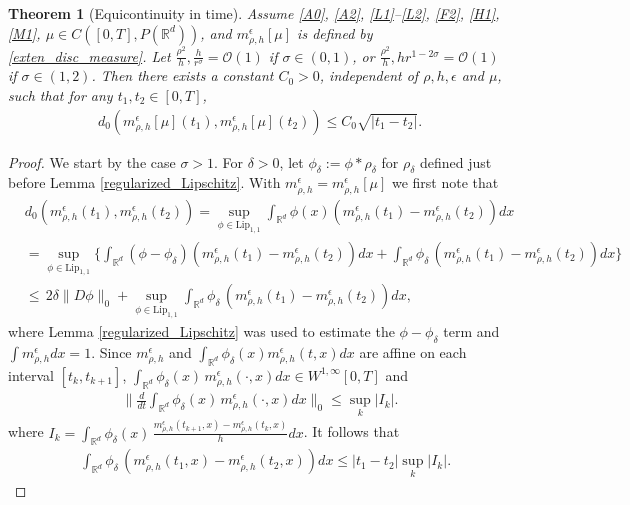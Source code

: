 \documentclass[a4paper,  twoside, 10pt, leqno]{amsart}
\newcommand{\R}{\mathbb{R}}
\newcommand{\rd}{\mathbb{R}^d}
\newcommand{\Lip}{\mbox{Lip}}
\newtheorem{thm}{Theorem}[section]
\theoremstyle{remark}
\theoremstyle{definition}
\begin{document}
\begin{thm}[Equicontinuity in time]\label{thm:time_equicont_m}
    Assume \ref{A0}, \ref{A2}, \ref{L1}--\ref{L2},  \ref{F2}, \ref{H1}, \ref{M1}, $\mu \in  C ( [0,T], P ( \rd ))$, and  $m^{\epsilon}_{\rho,h}[\mu]$ is defined by \eqref{exten_disc_measure}.  Let  $\frac{\rho^{2}}{h},\frac h{r^{\sigma}}=\mathcal{O}(1)$ if $\sigma\in (0,1)$, or  $\frac{\rho^{2}}{h},h r^{1-2\sigma}=\mathcal{O}(1)$ if $\sigma\in (1,2)$. Then there exists a constant $C_0>0$, independent of $\rho, h, \epsilon$ and $\mu$, such that for any $t_1,t_2 \in [0,T]$,
\begin{align*}
d_0 (m^\epsilon_{\rho,h}[\mu](t_1),m^\epsilon_{\rho,h}[\mu](t_2)) \leq C_0 \sqrt{|t_1-t_2|}. 
\end{align*}
\end{thm}
\begin{proof}
We start by the case $\sigma>1$. For $\delta>0$, let $\phi_{\delta}:= \phi*\rho_{\delta}$ for $\rho_{\delta}$ defined just before Lemma \ref{regularized_Lipschitz}. With $m^\epsilon_{\rho,h}=m^\epsilon_{\rho,h}[\mu]$ we first note that
\begin{align} 
  & d_0  (m^\epsilon_{\rho,h}(t_1), m^\epsilon_{\rho,h}(t_2))=  \sup_{\phi\in \Lip_{1,1}}\int_{\rd} \phi(x) (m^\epsilon_{\rho,h}(t_1)-m^\epsilon_{\rho,h}(t_2))dx \nonumber\\
 &=  \sup_{\phi\in \Lip_{1,1}}\Big\{\int_{\rd}(\phi-\phi_\delta)(m^\epsilon_{\rho,h}(t_1)-m^\epsilon_{\rho,h}(t_2))dx + \int_{\rd} \phi_\delta \,  (m^\epsilon_{\rho,h}(t_1)-m^\epsilon_{\rho,h}(t_2))dx\Big\} \nonumber\\
 & \leq \, 2 \delta \| D\phi \|_0  + \sup_{\phi\in \Lip_{1,1}}\int_{\rd} \phi_\delta \, (m^\epsilon_{\rho,h}(t_1)-m^\epsilon_{\rho,h}(t_2))dx, \label{regular_KR_dist}
\end{align}
where Lemma \ref{regularized_Lipschitz} was used to estimate the $\phi-\phi_\delta$ term and $\int m^\epsilon_{\rho,h}dx=1$. Since $m^\epsilon_{\rho,h}$ and $\int_{\R^d} \phi_{\delta}(x) m^\epsilon_{\rho,h}(t,x)dx$ are affine on each interval $[t_k,t_{k+1}]$,  $\int_{\R^d} \phi_{\delta}(x) \, m^\epsilon_{\rho,h}(\cdot,x)dx\in W^{1,\infty}[0,T]$ and 
\begin{align*}
\Big\|\frac{d}{dt} \int_{\R^d} \phi_{\delta}(x) \, m^\epsilon_{\rho,h}(\cdot,x) dx\Big\|_{0} \leq \sup_k |I_k|.
\end{align*}
where $I_k= \int_{\R^d} \phi_{\delta}(x) \, \frac{m^\epsilon_{\rho,h}(t_{k+1},x)-m^\epsilon_{\rho,h}(t_k,x)}{h}dx$.
It follows that
\begin{align}\label{diff-m}
 &\int_{\R^d} \phi_{\delta} \, (m^{\epsilon}_{\rho,h}(t_1,x)- m^{\epsilon}_{\rho,h}(t_2,x))dx
  \leq  |t_1-t_2| \sup_k |I_k|. 
\end{align}


\end{proof}
\end{document}

